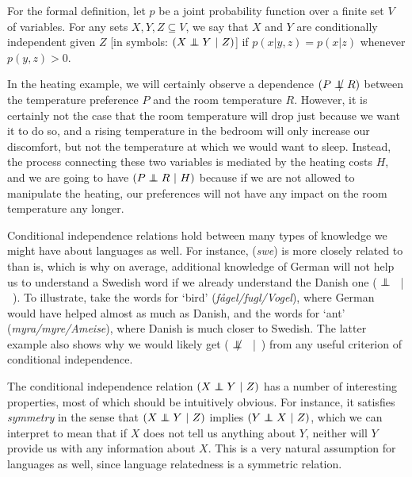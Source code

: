 \newpage 
For the formal definition, let $p$ be a joint probability function over a finite set $V$ of variables. For any sets $X,Y,Z \subseteq V$, we say that $X$ and $Y$ are conditionally independent given $Z$ [in symbols: $(X \independent Y\ |\ Z)$] if $p(x|y,z) = p(x|z)$ whenever $p(y,z) > 0$.

In the heating example, we will certainly observe a dependence $(P \notindep R)$ between the temperature preference $P$ and the room temperature $R$. However, it is certainly not the case that the room temperature will drop just because we want it to do so, and a rising temperature in the bedroom will only increase our discomfort, but not the temperature at which we would want to sleep. Instead, the process connecting these two variables is mediated by the heating costs $H$, and we are going to have $(P \independent R\ |\ H)$ because if we are not allowed to manipulate the heating, our preferences will not have any impact on the room temperature any longer.

Conditional independence relations hold between many types of knowledge we might have about languages as well. For instance,  (\textit{swe}) is more closely related to  than  is, which is why on average, additional knowledge of German will not help us to understand a Swedish word if we already understand the Danish one ( $\independent$ \ |\ ). To illustrate, take the words for `bird' (\textit{fågel/fugl/Vogel}), where German would have helped almost as much as Danish, and the words for `ant' (\textit{myra/myre/Ameise}), where Danish is much closer to Swedish. The latter example also shows why we would likely get ( $\notindep$ \ |\ ) from any useful criterion of conditional independence.

The conditional independence relation $(X \independent Y\ |\ Z)$ has a number of interesting properties, most of which should be intuitively obvious. For instance, it satisfies \textit{symmetry} in the sense that $(X \independent Y\ |\ Z)$ implies $(Y \independent X\ |\ Z)$, which we can interpret to mean that if $X$ does not tell us anything about $Y$, neither will $Y$ provide us with any information about $X$. This is a very natural assumption for languages as well, since language relatedness is a symmetric relation. 

